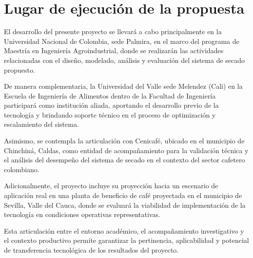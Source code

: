 \section{Lugar de ejecución de la propuesta}

El desarrollo del presente proyecto se llevará a cabo principalmente en la Universidad Nacional de Colombia, sede Palmira, en el marco del programa de Maestría en Ingeniería Agroindustrial, donde se realizarán las actividades relacionadas con el diseño, modelado, análisis y evaluación del sistema de secado propuesto.

De manera complementaria, la Universidad del Valle sede Melendez (Cali) en la Escuela de Ingeniería de Alimentos dentro de la Facultad de Ingeniería participará como institución aliada, aportando el desarrollo previo de la tecnología y brindando soporte técnico en el proceso de optimización y escalamiento del sistema.

Asimismo, se contempla la articulación con Cenicafé, ubicado en el municipio de Chinchiná, Caldas, como entidad de acompañamiento para la validación técnica y el análisis del desempeño del sistema de secado en el contexto del sector cafetero colombiano.

Adicionalmente, el proyecto incluye su proyección hacia un escenario de aplicación real en una planta de beneficio de café proyectada en el municipio de Sevilla, Valle del Cauca, donde se evaluará la viabilidad de implementación de la tecnología en condiciones operativas representativas.

Esta articulación entre el entorno académico, el acompañamiento investigativo y el contexto productivo permite garantizar la pertinencia, aplicabilidad y potencial de transferencia tecnológica de los resultados del proyecto.